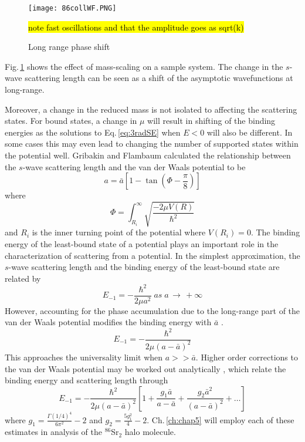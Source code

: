 \begin{figure} \label{fig:longRange}
	\centerline{
	\texttt{[image: 86collWF.PNG]}}
	\caption{Long range phase shift}{ \hl{note fast oscillations and that the amplitude goes as sqrt(k)}}
\end{figure} 
Fig.\,\ref{fig:longRange} shows the effect of mass-scaling on a sample system.
The change in the $s$-wave scattering length can be seen as a shift of the asymptotic wavefunctions at long-range.

Moreover, a change in the reduced mass is not isolated to affecting the scattering states.
For bound states, a change in $\mu$ will result in shifting of the binding energies as the solutions to Eq.\,\ref{eq:3radSE} when $E<0$ will also be different.
In some cases this may even lead to changing the number of supported states within the potential well.
Gribakin and Flambaum \cite{gfl93} calculated the relationship between the $s$-wave scattering length and the van der Waals potential to be
\begin{equation}
	a = \bar{a} \left[ 1 - \tan(\Phi - \frac{\pi}{8}) \right]
\end{equation} 
where
\begin{equation}
	\Phi = \int_{R_i}^{\infty} \sqrt{\frac{-2\mu V(R)}{\hbar^2}}
\end{equation}
and $R_i$ is the inner turning point of the potential where $V(R_i)=0$.
The binding energy of the least-bound state of a potential plays an important role in the characterization of scattering from a potential.
In the simplest approximation, the $s$-wave scattering length and the binding energy of the least-bound state are related by
\begin{equation}
	E_{-1} = -\frac{\hbar^2}{2 \mu a^2} \; as \; a\,\rightarrow\,+\infty
\end{equation}
However, accounting for the phase accumulation due to the long-range part of the van der Waals potential modifies the binding energy with $\bar{a}$ \cite{gfl93}.
\begin{equation}
	E_{-1} = -\frac{\hbar^2}{2\mu(a-\bar{a})^2}
\end{equation}
This approaches the universality limit when $a >> \bar{a}$.
Higher order corrections to the van der Waals potential may be worked out analytically \cite{gao04}, which relate the binding energy and scattering length through
\begin{equation}
	E_{-1} = -\frac{\hbar^2}{2\mu(a-\bar{a})^2}\left[1 + \frac{g_1 \bar{a}}{a-\bar{a}} + \frac{g_2 \bar{a}^2}{(a-\bar{a})^2}+\dots \right]
\end{equation}
where $g_1=\frac{\Gamma(1/4)^4}{6 \pi^2} - 2$ and $g_2 = \frac{5 g_1^2}{4} - 2$.
Ch.\,\ref{ch:chap5} will employ each of these estimates in analysis of the $^{86}$Sr$_2$ halo molecule.

